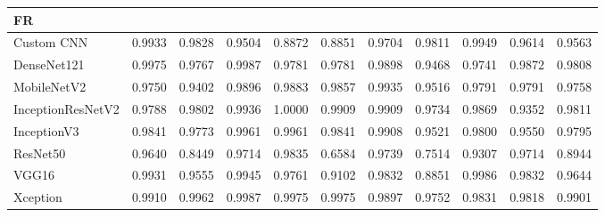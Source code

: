 \documentclass[a4paper,fleqn]{cas-dc}
\begin{document}
\begin{table}[t]
\begin{tabular}{l *{10}{r}}
        \midrule
        \multicolumn{11}{l}{\textbf{FR }} \\
        \midrule
        Custom CNN        & 0.9933 & 0.9828 & 0.9504 & 0.8872 & 0.8851 & 0.9704 & 0.9811 & 0.9949 & 0.9614 & 0.9563 \\
        DenseNet121       & 0.9975 & 0.9767 & 0.9987 & 0.9781 & 0.9781 & 0.9898 & 0.9468 & 0.9741 & 0.9872 & 0.9808 \\
        MobileNetV2       & 0.9750 & 0.9402 & 0.9896 & 0.9883 & 0.9857 & 0.9935 & 0.9516 & 0.9791 & 0.9791 & 0.9758 \\
        InceptionResNetV2 & 0.9788 & 0.9802 & 0.9936 & 1.0000 & 0.9909 & 0.9909 & 0.9734 & 0.9869 & 0.9352 & 0.9811 \\
        InceptionV3       & 0.9841 & 0.9773 & 0.9961 & 0.9961 & 0.9841 & 0.9908 & 0.9521 & 0.9800 & 0.9550 & 0.9795 \\
        ResNet50          & 0.9640 & 0.8449 & 0.9714 & 0.9835 & 0.6584 & 0.9739 & 0.7514 & 0.9307 & 0.9714 & 0.8944 \\
        VGG16             & 0.9931 & 0.9555 & 0.9945 & 0.9761 & 0.9102 & 0.9832 & 0.8851 & 0.9986 & 0.9832 & 0.9644 \\
        Xception          & 0.9910 & 0.9962 & 0.9987 & 0.9975 & 0.9975 & 0.9897 & 0.9752 & 0.9831 & 0.9818 & 0.9901 \\

        \bottomrule
    \end{tabular}
\end{table}
\end{document}
